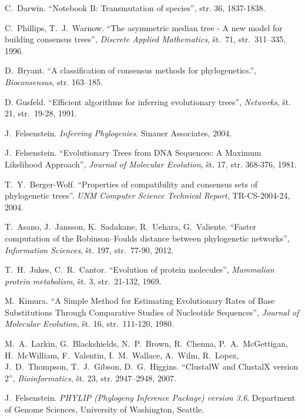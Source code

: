 \documentclass[a4paper, 12pt]{book}
\begin{document}
\begin{thebibliography}{99}

C.\ Darwin. ``Notebook B: Transmutation of species'', str. 36, 1837-1838.

C.\ Phillips, T.\ J.\ Warnow. ``The asymmetric median tree - A new model for building consensus trees'', {\it Discrete Applied Mathematics}, št.\ 71, str.\ 311–335, 1996.

D.\ Bryant. ``A classification of consensus methods for phylogenetics.'', {\it Bioconsensus}, str. 163–185.

D. Gusfeld. ``Efficient algorithms for inferring evolutionary trees'', {\it Networks}, št. 21, str.\ 19-28, 1991.

J.\ Felsenstein. \textit{Inferring Phylogenies}. Sinauer Associates, 2004.

J.\ Felsenstein. ``Evolutionary Trees from DNA Sequences: A Maximum Likelihood Approach'', {\it Journal of Molecular Evolution}, št. 17, str. 368-376, 1981.

T.\ Y.\ Berger-Wolf. ``Properties of compatibility and consensus sets of phylogenetic trees''. {\it UNM Computer Science Technical Report}, TR-CS-2004-24, 2004.

T.\ Asano, J.\ Jansson, K.\ Sadakane, R.\ Uehara, G.\ Valiente. ``Faster computation of the Robinson–Foulds distance between phylogenetic networks'', {\it Information Sciences}, št. 197, str.\ 77-90, 2012.

T.\ H.\ Jukes, C.\ R.\ Cantor. ``Evolution of protein molecules'', {\it Mammalian protein metabolism}, št. 3, str.\ 21-132, 1969.

M.\ Kimura. ``A Simple Method for Estimating Evolutionary Rates of Base Substitutions Through Comparative Studies of Nucleotide Sequences'', {\it Journal of Molecular Evolution}, št. 16, str.\ 111-120, 1980.

M.\ A.\ Larkin, G.\ Blackshields, N.\ P.\ Brown, R.\ Chenna, P.\ A.\ McGettigan, H.\ McWilliam, F.\ Valentin, I.\ M.\ Wallace, A.\ Wilm, R.\ Lopez, J.\ D.\ Thompson,
T.\ J.\ Gibson, D.\ G.\ Higgins. ``ClustalW and ClustalX version 2'', {\it Bioinformatics}, št. 23, str. 2947–2948, 2007.

J.\ Felsenstein. {\it PHYLIP (Phylogeny Inference Package) version 3.6}. Department of Genome Sciences, University of Washington, Seattle.


\end{thebibliography}
\end{document}
